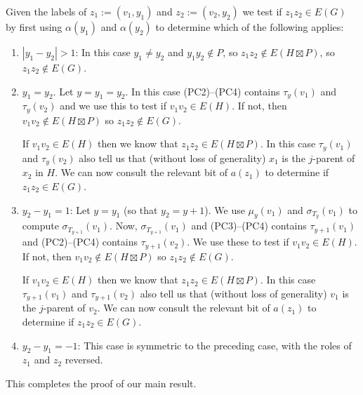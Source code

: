\documentclass[kpfonts]{patmorin}
\begin{document}
Given the labels of $z_1:=(v_1,y_1)$ and $z_2:=(v_2,y_2)$ we test if $z_1z_2\in E(G)$ by first using $\alpha(y_1)$ and $\alpha(y_2)$ to determine which of the following applies:
\begin{enumerate}
  \item $|y_1-y_2|>1$: In this case $y_1\neq y_2$ and $y_1y_2\not\in P$, so $z_1z_2\not\in E(H\boxtimes P)$, so $z_1z_2\not\in E(G)$.

  \item $y_1=y_2$.  Let $y=y_1=y_2$.  In this case (PC2)--(PC4) contains $\tau_{y}(v_1)$ and $\tau_{y}(v_2)$ and we use this to test if $v_1v_2\in E(H)$.  If not, then $v_1v_2\not\in E(H\boxtimes P)$ so $z_1z_2\not\in E(G)$.  
  
  If $v_1v_2\in E(H)$ then we know that $z_1z_2\in E(H\boxtimes P)$.  In this case $\tau_{y}(v_1)$ and $\tau_{y}(v_2)$ also tell us that (without loss of generality) $x_1$ is the $j$-parent of $x_2$ in $H$.  We can now consult the relevant bit of $a(z_1)$ to determine if $z_1z_2\in E(G)$.

  \item $y_2-y_1=1$: Let $y=y_1$ (so that $y_2=y+1$).  We use $\mu_y(v_1)$ and $\sigma_{T_y}(v_1)$ to compute $\sigma_{T_{y+1}}(v_1)$.  Now, $\sigma_{T_{y+1}}(v_1)$ and (PC3)--(PC4) contains $\tau_{y+1}(v_1)$ and (PC2)--(PC4) contains $\tau_{y+1}(v_2)$.  We use these to test if $v_1v_2\in E(H)$.  If not, then $v_1v_2\not\in E(H\boxtimes P)$ so $z_1z_2\not\in E(G)$.  
  
  If $v_1v_2\in E(H)$ then we know that $z_1z_2\in E(H\boxtimes P)$.  In this case $\tau_{y+1}(v_1)$ and $\tau_{y+1}(v_2)$ also tell us that (without loss of generality) $v_1$ is the $j$-parent of $v_2$.  We can now consult the relevant bit of $a(z_1)$ to determine if $z_1z_2\in E(G)$.

  \item $y_2-y_1=-1$:  This case is symmetric to the preceding case, with the roles of $z_1$ and $z_2$ reversed.
\end{enumerate}

This completes the proof of our main result.
\end{document}
